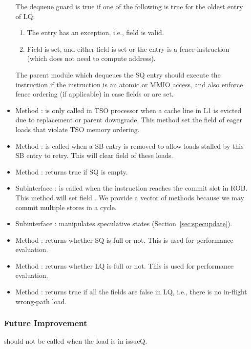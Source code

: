 \begin{itemize}
    The dequeue guard is true if one of the following is true for the oldest entry of LQ:
    \begin{enumerate}
        \item The entry has an exception, i.e., field  is valid.
        \item Field  is set, and either field  is set or the entry is a fence instruction (which does not need to compute address).
    \end{enumerate}
    The parent module which dequeues the SQ entry should execute the instruction if the instruction is an atomic or MMIO access, and also enforce fence ordering (if applicable) in case fields  or  are set.
    \item Method : is only called in TSO processor when a cache line in L1 is evicted due to replacement or parent downgrade.
    This method set the  field of eager loads that violate TSO memory ordering.
    \item Method : is called when a SB entry is removed to allow loads stalled by this SB entry to retry.
    This will clear field  of these loads.
    \item Method : returns true if SQ is empty.
    \item Subinterface : is called when the instruction reaches the commit slot in ROB.
    This method will set field .
    We provide a vector of methods because we may commit multiple stores in a cycle.
    \item Subinterface : manipulates speculative states (Section~\ref{sec:specupdate}).
    \item Method : returns whether SQ is full or not. This is used for performance evaluation.
    \item Method : returns whether LQ is full or not. This is used for performance evaluation.
    \item Method : returns true if all the  fields are false in LQ, i.e., there is no in-flight wrong-path load.
\end{itemize}

\subsubsection{Future Improvement}

 should not be called when the load is in issueQ.
